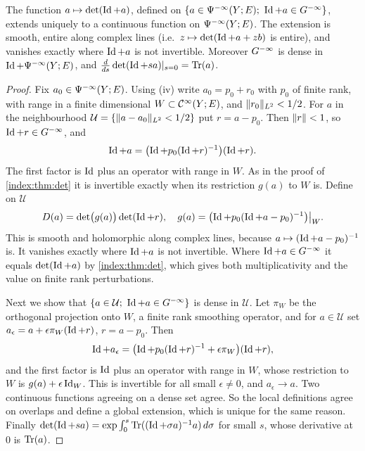\begin{theorem}\label{index:thm:det-extension}
  The function $a\mapsto\det(\operatorname{Id}+a)$, defined on
  $\{a\in\Psido{-\infty}(Y;E);\ \Id+a\in\Ginf\}$, extends uniquely to a
  continuous function on $\Psi^{-\infty}(Y;E)$. The extension is smooth,
  entire along complex lines (i.e.\ $z\mapsto\det(\operatorname{Id}+a+zb)$ is entire), and
  vanishes exactly where $\operatorname{Id}+a$ is not invertible. Moreover $G^{-\infty}$ is dense
  in $\operatorname{Id}+\Psi^{-\infty}(Y;E)$, and
  $\frac{d}{ds}\det(\operatorname{Id}+sa)|_{s=0}=\operatorname{Tr}(a)$.
\end{theorem}
\begin{proof}
  Fix $a_0\in\Psi^{-\infty}(Y;E)$. Using (iv) write $a_0=p_0+r_0$ with $p_0$
  of finite rank, with range in a finite dimensional $W\subset\mathcal{C}^\infty(Y;E)$, and
  $\lVert r_0\rVert_{L^2}<1/2$. For $a$ in the neighbourhood
  $\mathcal U=\{\lVert a-a_0\rVert_{L^2}<1/2\}$ put $r=a-p_0$. Then $\lVert r\rVert<1$, so
  $\operatorname{Id}+r\in G^{-\infty}$, and
  \begin{equation*}
    \operatorname{Id}+a=\bigl(\operatorname{Id}+p_0(\operatorname{Id}+r)^{-1}\bigr)(\operatorname{Id}+r).
  \end{equation*}
  The first factor is $\operatorname{Id}$ plus an operator with range in $W$. As in the
  proof of \cref{index:thm:det} it is invertible exactly when its restriction
  $g(a)$ to $W$ is. Define on $\mathcal U$
  \begin{equation*}
    D(a)=\det\bigl(g(a)\bigr)\det(\operatorname{Id}+r),\quad
    g(a)=\bigl(\operatorname{Id}+p_0(\operatorname{Id}+a-p_0)^{-1}\bigr)\big|_W.
  \end{equation*}
  This is smooth and holomorphic along complex lines, because
  $a\mapsto(\operatorname{Id}+a-p_0)^{-1}$ is. It vanishes exactly where $\operatorname{Id}+a$ is not
  invertible. Where $\operatorname{Id}+a\in G^{-\infty}$ it equals $\det(\operatorname{Id}+a)$ by
  \cref{index:thm:det}, which gives both multiplicativity and the value on
  finite rank perturbations.

  Next we show that $\{a\in\mathcal U;\ \Id+a\in\Ginf\}$ is dense in $\mathcal
  U$. Let $\pi_W$ be the orthogonal projection onto $W$, a finite rank
  smoothing operator, and for $a\in\mathcal U$ set
  $a_\epsilon=a+\epsilon\pi_W(\operatorname{Id}+r)$, $r=a-p_0$. Then
  \begin{equation*}
    \operatorname{Id}+a_\epsilon=\bigl(\operatorname{Id}+p_0(\operatorname{Id}+r)^{-1}+\epsilon\pi_W\bigr)(\operatorname{Id}+r),
  \end{equation*}
  and the first factor is $\operatorname{Id}$ plus an operator with range in $W$, whose
  restriction to $W$ is $g(a)+\epsilon\operatorname{Id}_W$. This is invertible for all
  small $\epsilon\ne0$, and $a_\epsilon\to a$.
  Two continuous functions agreeing on a dense set agree. So the local
  definitions agree on overlaps and define a global extension, which is
  unique for the same reason. Finally
  $\det(\operatorname{Id}+sa)=\exp\int_0^s\operatorname{Tr}((\operatorname{Id}+\sigma a)^{-1}a)\,d\sigma$ for small
  $s$, whose derivative at $0$ is $\operatorname{Tr}(a)$.
\end{proof}

